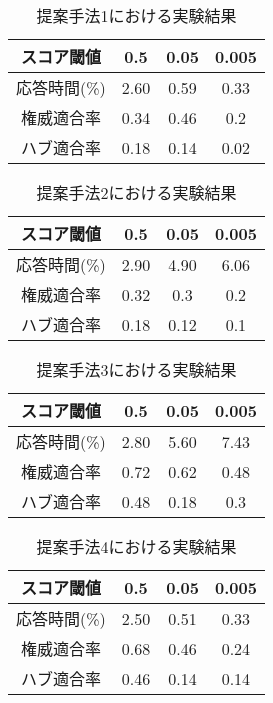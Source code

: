 \documentclass[a4paper,11pt]{jreport}
\begin{document}
\begin{table}[htb]
\begin{center}
\caption{提案手法1における実験結果}
\begin{tabular}{|c||c|c|c|} \hline 
    スコア閾値 & 0.5 & 0.05 & 0.005 \\ \hline \hline
    応答時間(\%) & 2.60 & 0.59 & 0.33 \\  \hline
    権威適合率 & 0.34 & 0.46 & 0.2 \\ \hline
    ハブ適合率 & 0.18 & 0.14 & 0.02 \\ \hline
\end{tabular}
\end{center}
\end{table}

\begin{table}[htb]
\begin{center}
\caption{提案手法2における実験結果}
\begin{tabular}{|c||c|c|c|} \hline 
    スコア閾値 & 0.5 & 0.05 & 0.005 \\ \hline \hline
    応答時間(\%) & 2.90 & 4.90 & 6.06 \\  \hline
    権威適合率 & 0.32 & 0.3 & 0.2 \\ \hline
    ハブ適合率 & 0.18 & 0.12 & 0.1 \\ \hline
\end{tabular}
\end{center}
\end{table}

\begin{table}[htb]
\begin{center}
\caption{提案手法3における実験結果}
\begin{tabular}{|c||c|c|c|} \hline 
    スコア閾値 & 0.5 & 0.05 & 0.005 \\ \hline \hline
    応答時間(\%) & 2.80 & 5.60 & 7.43 \\  \hline
    権威適合率 & 0.72 & 0.62 & 0.48 \\ \hline
    ハブ適合率 & 0.48 & 0.18 & 0.3 \\ \hline
\end{tabular}
\end{center}
\end{table}

\begin{table}[htb]
\begin{center}
\caption{提案手法4における実験結果}
\begin{tabular}{|c||c|c|c|} \hline 
    スコア閾値 & 0.5 & 0.05 & 0.005 \\ \hline \hline
    応答時間(\%) & 2.50 & 0.51 & 0.33 \\  \hline
    権威適合率 & 0.68 & 0.46 & 0.24 \\ \hline
    ハブ適合率 & 0.46 & 0.14 & 0.14 \\ \hline
\end{tabular}
\end{center}
\end{table}
\end{document}
